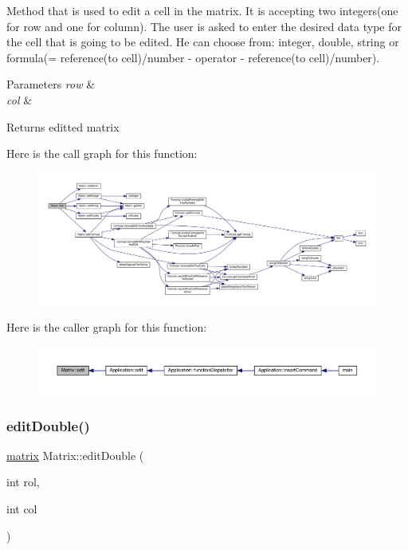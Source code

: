 Method that is used to edit a cell in the matrix. It is accepting two integers(one for row and one for column). The user is asked to enter the desired data type for the cell that is going to be edited. He can choose from\+: integer, double, string or formula(= reference(to cell)/number -\/ operator -\/ reference(to cell)/number). 
\begin{DoxyParams}{Parameters}
{\em row} & \\
\hline
{\em col} & \\
\hline
\end{DoxyParams}
\begin{DoxyReturn}{Returns}
editted matrix 
\end{DoxyReturn}
Here is the call graph for this function\+:\nopagebreak
\begin{figure}[H]
\begin{center}
\leavevmode
\includegraphics[width=350pt]{class_matrix_a34b2269a2b6d06c202439de2e64009ba_cgraph}
\end{center}
\end{figure}
Here is the caller graph for this function\+:\nopagebreak
\begin{figure}[H]
\begin{center}
\leavevmode
\includegraphics[width=350pt]{class_matrix_a34b2269a2b6d06c202439de2e64009ba_icgraph}
\end{center}
\end{figure}
\mbox{\label{class_matrix_a147d3813e96ef757fb0d5ff65e5f97ef}} 
\subsubsection{\texorpdfstring{edit\+Double()}{editDouble()}}
{\footnotesize\ttfamily \hyperlink{formula_8h_a869e2a5deeb3daa4c82d6bc91cf20d92}{matrix} Matrix\+::edit\+Double (\begin{DoxyParamCaption}\item[{int}]{rol,  }\item[{int}]{col }\end{DoxyParamCaption})\hspace{0.3cm}{\ttfamily [private]}}

